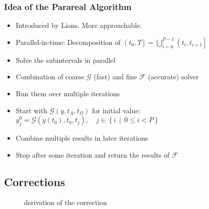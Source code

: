 \begin{frame}
    \frametitle{Idea of the Parareal Algorithm}
    \begin{itemize}[<+->]
        \item Introduced by Lions. More approachable.
        \item Parallel-in-time: Decomposition of \(\left(t_0, T\right] = \bigcup_{i=0}^{P-1} \left(t_i, t_{i+1}\right]\)
        \item Solve the subintervals in parallel
        \item Combination of coarse \(\mathcal{G}\) (fast) and fine \(\mathcal{F}\) (accurate) solver
        \item Run them over multiple iterations
        \item Start with \(\mathcal{G}\!\left(y, t_{A}, t_{\Omega}\right)\) for initial value:\\\(y_{j}^{0} = \mathcal{G}\!\left(y(t_0), t_0, t_{j}\right), \quad j \in \left\{i \,\middle|\, 0 \leq i < P\right\}\)
        \begin{scriptsize}
        \end{scriptsize}
        \item Combine multiple results in later iterations
        \item Stop after some iteration and return the results of \(\mathcal{F}\)
    \end{itemize}
    \end{frame}

\subsection{Corrections}

\begin{frame}
\begin{figure}[ht]
    \centering
        \begin{tikzpicture}[scale=1.7]
            
        \end{tikzpicture}
    \caption{derivation of the correction}
    \label{fig:merge}
\end{figure}
\end{frame}

